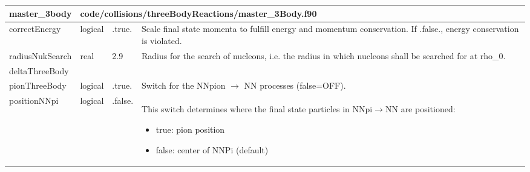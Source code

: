 \documentclass{article}
\begin{document}
\begin{longtable}{llll}
\toprule
\textbf{\large{master\_3body}} & \multicolumn{3}{l}{\footnotesize{code/collisions/threeBodyReactions/master\_3Body.f90}}\\*
\midrule
\endfirsthead
\midrule
\endhead
correctEnergy & \begin{minipage}[t]{2cm}logical\end{minipage} & \begin{minipage}[t]{2cm}.true.\end{minipage} & \begin{minipage}[t]{12cm}Scale final state momenta to fulfill energy and momentum conservation. If .false., energy conservation is violated.\end{minipage}\\*
\midrule
radiusNukSearch & \begin{minipage}[t]{2cm}real\end{minipage} & \begin{minipage}[t]{2cm}2.9\end{minipage} & \begin{minipage}[t]{12cm}Radius for the search of nucleons, i.e. the radius in which nucleons shall be searched for at rho\_0.\end{minipage}\\*
\midrule
deltaThreeBody & \begin{minipage}[t]{2cm}\end{minipage} & \begin{minipage}[t]{2cm}\end{minipage} & \begin{minipage}[t]{12cm}\end{minipage}\\*
\midrule
pionThreeBody & \begin{minipage}[t]{2cm}logical\end{minipage} & \begin{minipage}[t]{2cm}.true.\end{minipage} & \begin{minipage}[t]{12cm}Switch for the NNpion $\rightarrow$ NN processes (false=OFF).\end{minipage}\\*
\midrule
positionNNpi & \begin{minipage}[t]{2cm}logical\end{minipage} & \begin{minipage}[t]{2cm}.false.\end{minipage} & \begin{minipage}[t]{12cm}This switch determines where the final state particles in NNpi$\rightarrow$NN are positioned:\begin{itemize}\leftmargin0em\itemindent0pt\item true: pion position\item false: center of NNPi (default)\end{itemize}\end{minipage}\\*
\bottomrule
\end{longtable}
{ }
\end{document}
